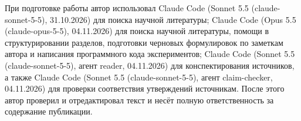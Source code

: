 При подготовке работы автор использовал Claude Code (Sonnet 5.5 (claude-sonnet-5-5), 31.10.2026) для поиска научной литературы; Claude Code (Opus 5.5 (claude-opus-5-5), 04.11.2026) для поиска научной литературы, помощи в структурировании разделов, подготовки черновых формулировок по заметкам автора и написания программного кода экспериментов; Claude Code (Sonnet 5.5 (claude-sonnet-5-5), агент reader, 04.11.2026) для конспектирования источников, а также Claude Code (Sonnet 5.5 (claude-sonnet-5-5), агент claim-checker, 04.11.2026) для проверки соответствия утверждений источникам. После этого автор проверил и отредактировал текст и несёт полную ответственность за содержание публикации.
